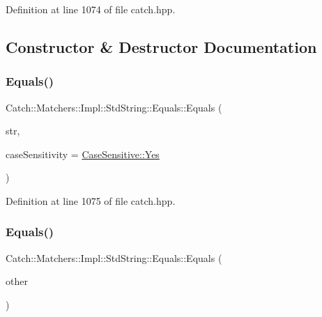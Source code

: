 Definition at line 1074 of file catch.\+hpp.



\subsection{Constructor \& Destructor Documentation}
\hypertarget{struct_catch_1_1_matchers_1_1_impl_1_1_std_string_1_1_equals_a5921d5ed75320fb64a678e3f1292a464}{}\label{struct_catch_1_1_matchers_1_1_impl_1_1_std_string_1_1_equals_a5921d5ed75320fb64a678e3f1292a464} 
\subsubsection{\texorpdfstring{Equals()}{Equals()}\hspace{0.1cm}{\footnotesize\ttfamily [1/2]}}
{\footnotesize\ttfamily Catch\+::\+Matchers\+::\+Impl\+::\+Std\+String\+::\+Equals\+::\+Equals (\begin{DoxyParamCaption}\item[{std\+::string const \&}]{str,  }\item[{\hyperlink{struct_catch_1_1_case_sensitive_aad49d3aee2d97066642fffa919685c6a}{Case\+Sensitive\+::\+Choice}}]{case\+Sensitivity = {\ttfamily \hyperlink{struct_catch_1_1_case_sensitive_aad49d3aee2d97066642fffa919685c6aa7c5550b69ec3c502e6f609b67f9613c6}{Case\+Sensitive\+::\+Yes}} }\end{DoxyParamCaption})\hspace{0.3cm}{\ttfamily [inline]}}



Definition at line 1075 of file catch.\+hpp.

\hypertarget{struct_catch_1_1_matchers_1_1_impl_1_1_std_string_1_1_equals_acaa97de06aedf363ae803d65a975f5e4}{}\label{struct_catch_1_1_matchers_1_1_impl_1_1_std_string_1_1_equals_acaa97de06aedf363ae803d65a975f5e4} 
\subsubsection{\texorpdfstring{Equals()}{Equals()}\hspace{0.1cm}{\footnotesize\ttfamily [2/2]}}
{\footnotesize\ttfamily Catch\+::\+Matchers\+::\+Impl\+::\+Std\+String\+::\+Equals\+::\+Equals (\begin{DoxyParamCaption}\item[{\hyperlink{struct_catch_1_1_matchers_1_1_impl_1_1_std_string_1_1_equals}{Equals} const \&}]{other }\end{DoxyParamCaption})\hspace{0.3cm}{\ttfamily [inline]}}



